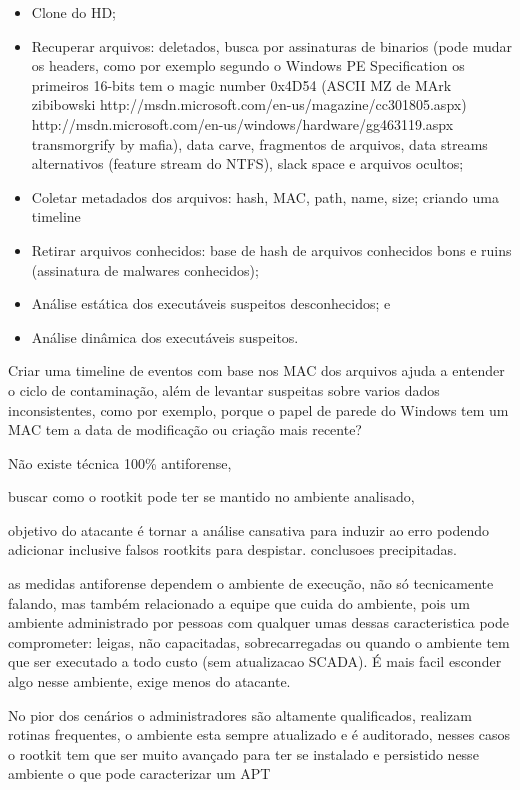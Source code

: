 \begin{itemize}
\item Clone do HD;
\item Recuperar arquivos: deletados, busca por assinaturas de binarios (pode mudar os headers, como por exemplo segundo o Windows PE Specification os primeiros 16-bits tem o magic number 0x4D54 (ASCII MZ de MArk zibibowski http://msdn.microsoft.com/en-us/magazine/cc301805.aspx) http://msdn.microsoft.com/en-us/windows/hardware/gg463119.aspx transmorgrify by mafia), data carve, fragmentos de arquivos, data streams alternativos (feature stream do NTFS), slack space e arquivos ocultos;
\item Coletar metadados dos arquivos: hash, MAC, path, name, size; criando uma timeline
\item Retirar arquivos conhecidos: base de hash de arquivos conhecidos bons e ruins (assinatura de malwares conhecidos);
\item Análise estática dos executáveis suspeitos desconhecidos; e
\item Análise dinâmica dos executáveis suspeitos.
\end{itemize}

Criar uma timeline de eventos com base nos MAC dos arquivos ajuda a entender o ciclo de contaminação, além de levantar suspeitas sobre varios dados inconsistentes, como por exemplo, porque o papel de parede do Windows tem um MAC tem a data de modificação ou criação mais recente?





Não existe técnica 100\% antiforense,

buscar como o rootkit pode ter se mantido no ambiente analisado, 

objetivo do atacante é tornar a análise cansativa para induzir ao erro podendo adicionar inclusive falsos rootkits para despistar. conclusoes precipitadas.

as medidas antiforense dependem o ambiente de execução, não só tecnicamente falando, mas também relacionado a equipe que cuida do ambiente, pois um ambiente administrado por pessoas com qualquer umas dessas caracteristica pode comprometer: leigas, não capacitadas, sobrecarregadas ou quando o ambiente tem que ser executado a todo custo (sem atualizacao SCADA). É mais facil esconder algo nesse ambiente, exige menos do atacante. 

No pior dos cenários o administradores são altamente qualificados, realizam rotinas frequentes, o ambiente esta sempre atualizado e é auditorado, nesses casos o rootkit tem que ser muito avançado para ter se instalado e persistido nesse ambiente o que pode caracterizar um APT


